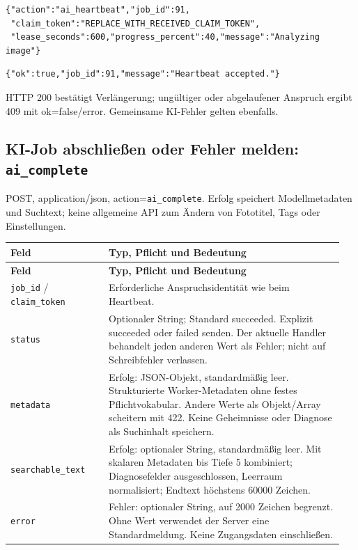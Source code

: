 \documentclass[11pt,a4paper]{article}
\newcommand{\codeword}[1]{\nolinkurl{#1}}
\begin{document}
\begin{lstlisting}[language={}]
{"action":"ai_heartbeat","job_id":91,
 "claim_token":"REPLACE_WITH_RECEIVED_CLAIM_TOKEN",
 "lease_seconds":600,"progress_percent":40,"message":"Analyzing image"}
\end{lstlisting}

\begin{lstlisting}[language={}]
{"ok":true,"job_id":91,"message":"Heartbeat accepted."}
\end{lstlisting}

HTTP 200 bestätigt Verlängerung; ungültiger oder abgelaufener Anspruch ergibt 409 mit
ok=false/error. Gemeinsame KI-Fehler gelten ebenfalls.

\subsection{\texorpdfstring{KI-Job abschließen oder Fehler melden: \codeword{ai_complete}}{KI-Job abschließen oder Fehler melden: ai\_complete}}

\label{api352:ai-complete}

POST, application/json, action=\codeword{ai_complete}. Erfolg speichert Modellmetadaten und
Suchtext; keine allgemeine API zum Ändern von Fototitel, Tags oder Einstellungen.

\begin{longtable}{@{}>{\RaggedRight\arraybackslash}p{0.28\linewidth}>{\RaggedRight\arraybackslash}p{0.67\linewidth}@{}}
\toprule
\textbf{Feld} & \textbf{Typ, Pflicht und Bedeutung} \\
\midrule
\endfirsthead
\toprule
\textbf{Feld} & \textbf{Typ, Pflicht und Bedeutung} \\
\midrule
\endhead
\bottomrule
\endfoot
\codeword{job_id} / \codeword{claim_token} & Erforderliche Anspruchsidentität wie beim
Heartbeat. \\
\codeword{status} & Optionaler String; Standard succeeded. Explizit succeeded oder failed
senden. Der aktuelle Handler behandelt jeden anderen Wert als Fehler; nicht auf
Schreibfehler verlassen. \\
\codeword{metadata} & Erfolg: JSON-Objekt, standardmäßig leer. Strukturierte
Worker-Metadaten ohne festes Pflichtvokabular. Andere Werte als Objekt/Array scheitern mit
422. Keine Geheimnisse oder Diagnose als Suchinhalt speichern. \\
\codeword{searchable_text} & Erfolg: optionaler String, standardmäßig leer. Mit skalaren
Metadaten bis Tiefe 5 kombiniert; Diagnosefelder ausgeschlossen, Leerraum normalisiert;
Endtext höchstens 60000 Zeichen. \\
\codeword{error} & Fehler: optionaler String, auf 2000 Zeichen begrenzt. Ohne Wert verwendet
der Server eine Standardmeldung. Keine Zugangsdaten einschließen. \\
\end{longtable}
\end{document}
